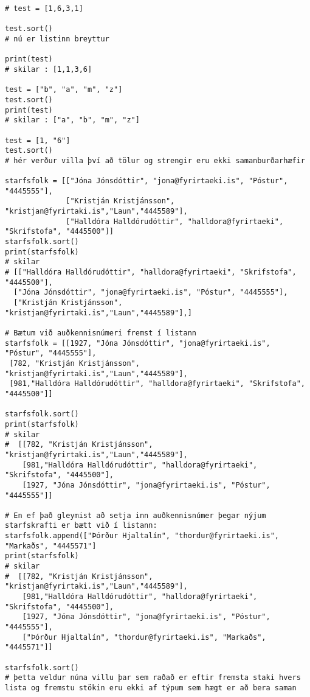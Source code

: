 \begin{lstlisting}[caption=.sort() aðferðin, label=lst:listar-sort]
# test = [1,6,3,1]

test.sort()
# nú er listinn breyttur

print(test)
# skilar : [1,1,3,6]

test = ["b", "a", "m", "z"]
test.sort()
print(test)
# skilar : ["a", "b", "m", "z"]

test = [1, "6"]
test.sort()
# hér verður villa því að tölur og strengir eru ekki samanburðarhæfir

starfsfolk = [["Jóna Jónsdóttir", "jona@fyrirtaeki.is", "Póstur", "4445555"],
			  ["Kristján Kristjánsson", "kristjan@fyrirtaki.is","Laun","4445589"],
			  ["Halldóra Halldórudóttir", "halldora@fyrirtaeki", "Skrifstofa", "4445500"]]
starfsfolk.sort()
print(starfsfolk)
# skilar 
# [["Halldóra Halldórudóttir", "halldora@fyrirtaeki", "Skrifstofa", "4445500"],
  ["Jóna Jónsdóttir", "jona@fyrirtaeki.is", "Póstur", "4445555"],
  ["Kristján Kristjánsson", "kristjan@fyrirtaki.is","Laun","4445589"],]
  
# Bætum við auðkennisnúmeri fremst í listann
starfsfolk = [[1927, "Jóna Jónsdóttir", "jona@fyrirtaeki.is", "Póstur", "4445555"],
 [782, "Kristján Kristjánsson", "kristjan@fyrirtaki.is","Laun","4445589"],
 [981,"Halldóra Halldórudóttir", "halldora@fyrirtaeki", "Skrifstofa", "4445500"]]
		     
starfsfolk.sort()
print(starfsfolk)
# skilar
#  [[782, "Kristján Kristjánsson", "kristjan@fyrirtaki.is","Laun","4445589"],
	[981,"Halldóra Halldórudóttir", "halldora@fyrirtaeki", "Skrifstofa", "4445500"],
	[1927, "Jóna Jónsdóttir", "jona@fyrirtaeki.is", "Póstur", "4445555"]]
	
# En ef það gleymist að setja inn auðkennisnúmer þegar nýjum starfskrafti er bætt við í listann:
starfsfolk.append(["Þórður Hjaltalín", "thordur@fyrirtaeki.is", "Markaðs", "4445571"]
print(starfsfolk)
# skilar
#  [[782, "Kristján Kristjánsson", "kristjan@fyrirtaki.is","Laun","4445589"],
	[981,"Halldóra Halldórudóttir", "halldora@fyrirtaeki", "Skrifstofa", "4445500"],
	[1927, "Jóna Jónsdóttir", "jona@fyrirtaeki.is", "Póstur", "4445555"],
	["Þórður Hjaltalín", "thordur@fyrirtaeki.is", "Markaðs", "4445571"]]

starfsfolk.sort() 
# þetta veldur núna villu þar sem raðað er eftir fremsta staki hvers lista og fremstu stökin eru ekki af týpum sem hægt er að bera saman
\end{lstlisting}

